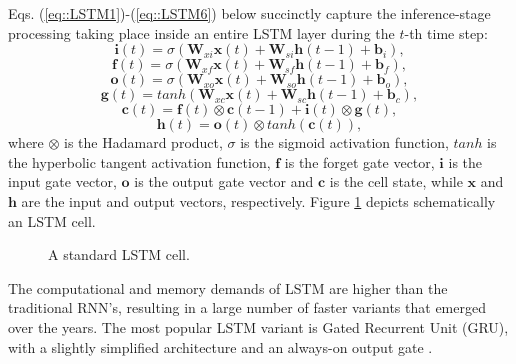 \documentclass[preprint,review,10pt]{elsarticle}
\begin{document}
	Eqs. (\ref{eq::LSTM1})-(\ref{eq::LSTM6}) below succinctly capture the inference-stage processing taking place inside an entire LSTM layer during the $t$-th time step:
	\begin{equation}
		\mathbf{i}(t) = \sigma(\mathbf{W}_{xi}\mathbf{x}(t) + \mathbf{W}_{si}\mathbf{h}(t-1) + \mathbf{b}_i),
		\label{eq::LSTM1}
	\end{equation}
	\begin{equation}
		\mathbf{f}(t) = \sigma(\mathbf{W}_{xf}\mathbf{x}(t) + \mathbf{W}_{sf}\mathbf{h}(t-1) + \mathbf{b}_f),
		\label{eq::LSTM2}
	\end{equation}
	\begin{equation}
		\mathbf{o}(t) = \sigma(\mathbf{W}_{xo}\mathbf{x}(t) + \mathbf{W}_{so}\mathbf{h}(t-1) + \mathbf{b}_o),
		\label{eq::LSTM3}
	\end{equation}
	\begin{equation}
		\mathbf{g}(t) = tanh(\mathbf{W}_{xc}\mathbf{x}(t) + \mathbf{W}_{sc}\mathbf{h}(t-1) + \mathbf{b}_c),
		\label{eq::LSTM4}
	\end{equation}
	\begin{equation}
		\mathbf{c}(t) = \mathbf{f}(t) \otimes \mathbf{c}(t-1) + \mathbf{i}(t) \otimes \mathbf{g}(t),
		\label{eq::LSTM5}
	\end{equation}
	\begin{equation}
		\mathbf{h}(t) = \mathbf{o}(t) \otimes tanh(\mathbf{c}(t)),
		\label{eq::LSTM6}
	\end{equation}
	\noindent where $\otimes$ is the Hadamard product, $\sigma$ is the sigmoid activation function, $tanh$ is the hyperbolic tangent activation function, $\mathbf{f}$ is the forget gate vector, $\mathbf{i}$ is the input gate vector, $\mathbf{o}$ is the output gate vector and $\mathbf{c}$ is the cell state, while $\mathbf{x}$ and $\mathbf{h}$ are the input and output vectors, respectively. Figure \ref{fig::LSTM} depicts schematically an LSTM cell.
	
	\begin{figure}
		\centering
		
		\caption{A standard LSTM cell.}
		\label{fig::LSTM}
	\end{figure}
	
	The computational and memory demands of LSTM are higher than the traditional RNN's, resulting in a large number of faster variants that emerged over the years. The most popular LSTM variant is Gated Recurrent Unit (GRU), with a slightly simplified architecture and an always-on output gate \cite{Cho2014}.
	
\end{document}
